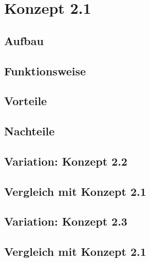 \section{Konzept 2.1}

\subsection{Aufbau}

\subsection{Funktionsweise}

\subsection{Vorteile}

\subsection{Nachteile}

\subsection{Variation: Konzept 2.2}

\subsection{Vergleich mit Konzept 2.1}

\subsection{Variation: Konzept 2.3}

\subsection{Vergleich mit Konzept 2.1}
